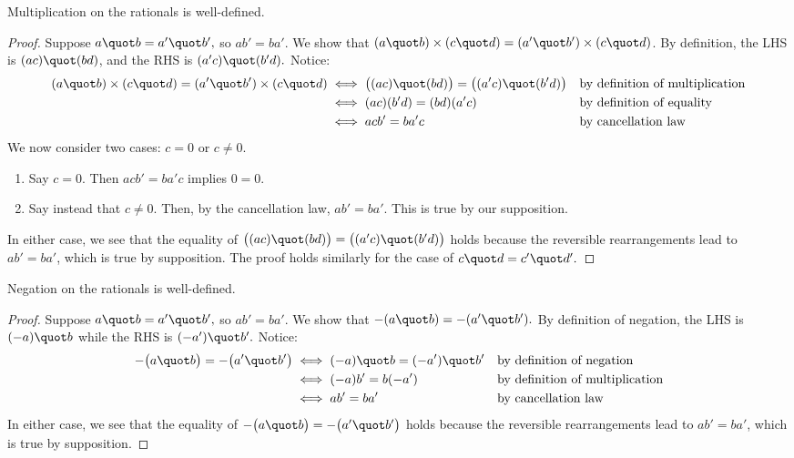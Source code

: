 \begin{proposition}
    Multiplication on the rationals is well-defined.
\end{proposition}
\begin{proof}
    Suppose $a \quot b = a' \quot b',$ so $a b' = ba'.$
    We show that $(a \quot b) \times (c \quot d) = (a' \quot b') \times (c \quot d)$.
    By definition, the LHS is $(ac) \quot (bd)$, and the RHS is $(a'c) \quot (b'd).$
    Notice:
    \begin{align*}
        (a \quot b) \times (c \quot d) = (a' \quot b') \times (c \quot d) &\iff \big((ac) \quot (bd) \big)= \big((a'c) \quot (b'd) \big) &&\text{by definition of multiplication}\\
        &\iff (ac)(b'd) = (bd)(a'c) && \text{by definition of equality}\\
        &\iff acb' = ba'c && \text{by cancellation law} \\
    \end{align*}
    We now consider two cases: $c = 0$ or $c \neq 0.$ 
    \begin{enumerate}
        \item Say $c = 0.$ Then $acb' = ba'c$ implies $0 = 0.$
        \item Say instead that $c \neq 0.$ Then, by the cancellation law, $ab'=ba'$. This is true by our supposition.
    \end{enumerate}
    In either case, we see that the equality of $\big((ac) \quot (bd) \big)= \big((a'c) \quot (b'd) \big)$ holds
    because the reversible rearrangements lead to $ab' = ba'$, which is true by supposition.
    The proof holds similarly for the case of $c \quot d = c' \quot d'.$

\end{proof}

\begin{proposition}
    Negation on the rationals is well-defined.
\end{proposition}
\begin{proof}
    Suppose $a \quot b = a' \quot b',$ so $ab' = ba'.$
    We show that $-(a \quot b) = -(a' \quot b').$
    By definition of negation, the LHS is $(-a) \quot b$ while the RHS is $(-a') \quot b'.$ Notice:
    \begin{align*}
        -\big(a \quot b \big)= -\big(a' \quot b' \big)  &\iff (-a) \quot b = (-a') \quot b' &&\text{by definition of negation}\\
        &\iff (-a)b' = b(-a') && \text{by definition of multiplication}\\
        &\iff ab' = ba' && \text{by cancellation law} \\
    \end{align*}   
    In either case, we see that the equality of $-\big(a \quot b \big)= -\big(a' \quot b' \big)$ holds
    because the reversible rearrangements lead to $ab' = ba'$, which is true by supposition.
\end{proof}

